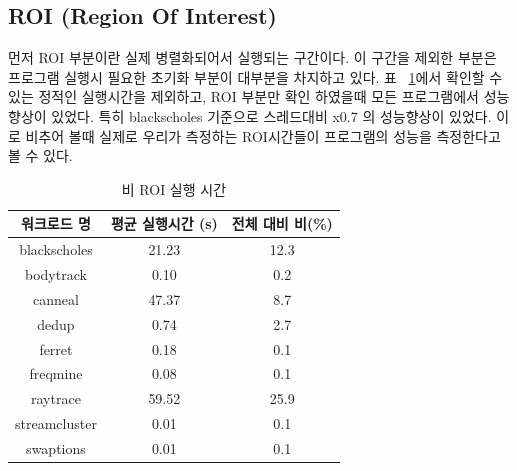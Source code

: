 \documentclass{kcc}
\begin{document}
\subsection{ROI (Region Of Interest)}
 먼저 ROI 부분이란 실제 병렬화되어서 실행되는 구간이다. 이 구간을 제외한 부분은 프로그램 실행시 필요한 초기화 부분이 대부분을 차지하고 있다. 표 ~\ref{tab:ROI_ratio}에서 확인할 수 있는 정적인 실행시간을 제외하고, ROI 부분만 확인 하였을때 모든 프로그램에서 성능향상이 있었다. 특히 blackscholes 기준으로 스레드대비 x0.7 의 성능향상이 있었다. 이로 비추어 볼때 실제로 우리가 측정하는 ROI시간들이 프로그램의 성능을 측정한다고 볼 수 있다.
\begin{table}
\caption{비 ROI 실행 시간} 
\label{tab:ROI_ratio}
\centering
\begin{tabular}{c|c|c}
\hline
워크로드 명 & 평균 실행시간 (s) & 전체 대비 비(\%) \\ \hline
blackscholes & 21.23 & 12.3 \\ \hline
bodytrack & 0.10 & 0.2 \\ \hline
canneal & 47.37 & 8.7 \\ \hline
dedup & 0.74 & 2.7\\ \hline
ferret & 0.18 & 0.1\\ \hline
freqmine & 0.08 & 0.1\\ \hline
raytrace & 59.52 & 25.9\\ \hline
streamcluster & 0.01 & 0.1\\ \hline
swaptions & 0.01 & 0.1\\ \hline
\end{tabular}
\end{table}
\end{document}
